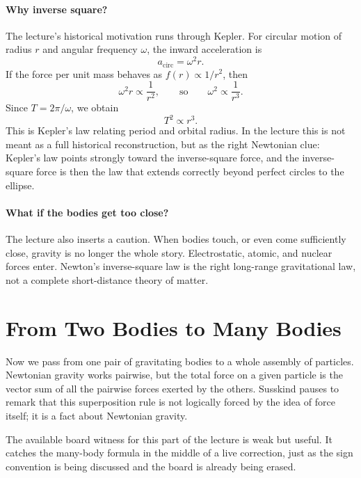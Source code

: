\paragraph{Why inverse square?}
The lecture's historical motivation runs through Kepler. For circular motion of radius \(r\) and angular frequency \(\omega\), the inward acceleration is
\begin{equation}
a_{\mathrm{circ}}=\omega^2 r.
\end{equation}
If the force per unit mass behaves as \(f(r)\propto 1/r^2\), then
\begin{equation}
\omega^2 r \propto \frac{1}{r^2},
\qquad\text{so}\qquad
\omega^2\propto \frac{1}{r^3}.
\end{equation}
Since \(T=2\pi/\omega\), we obtain
\begin{equation}
T^2\propto r^3.
\end{equation}
This is Kepler's law relating period and orbital radius. In the lecture this is not meant as a full historical reconstruction, but as the right Newtonian clue: Kepler's law points strongly toward the inverse-square force, and the inverse-square force is then the law that extends correctly beyond perfect circles to the ellipse.

\paragraph{What if the bodies get too close?}
The lecture also inserts a caution. When bodies touch, or even come sufficiently close, gravity is no longer the whole story. Electrostatic, atomic, and nuclear forces enter. Newton's inverse-square law is the right long-range gravitational law, not a complete short-distance theory of matter.

\section{From Two Bodies to Many Bodies}

Now we pass from one pair of gravitating bodies to a whole assembly of particles. Newtonian gravity works pairwise, but the total force on a given particle is the vector sum of all the pairwise forces exerted by the others. Susskind pauses to remark that this superposition rule is not logically forced by the idea of force itself; it is a fact about Newtonian gravity.

The available board witness for this part of the lecture is weak but useful. It catches the many-body formula in the middle of a live correction, just as the sign convention is being discussed and the board is already being erased.

